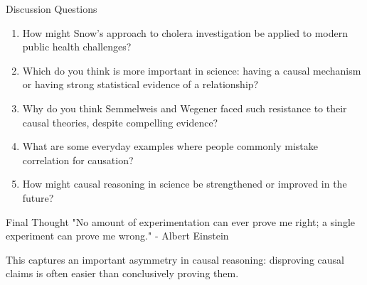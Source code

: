 \documentclass{beamer}
\begin{document}
\begin{frame}{Discussion Questions}
    \begin{enumerate}
        \item How might Snow's approach to cholera investigation be applied to modern public health challenges?
        \item Which do you think is more important in science: having a causal mechanism or having strong statistical evidence of a relationship?
        \item Why do you think Semmelweis and Wegener faced such resistance to their causal theories, despite compelling evidence?
        \item What are some everyday examples where people commonly mistake correlation for causation?
        \item How might causal reasoning in science be strengthened or improved in the future?
    \end{enumerate}
    
    \begin{block}{Final Thought}
        "No amount of experimentation can ever prove me right; a single experiment can prove me wrong." - Albert Einstein
        
        This captures an important asymmetry in causal reasoning: disproving causal claims is often easier than conclusively proving them.
    \end{block}
\end{frame}
\end{document}

